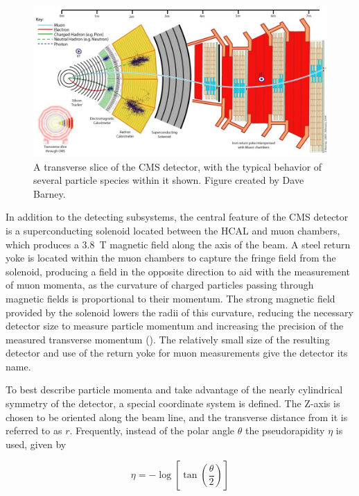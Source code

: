 \begin{figure}[htpb]
    \includegraphics[width=\textwidth]{figures/cmsSlice.jpg}
    \centering
	\caption[A Transverse Slice of the CMS Detector]{A transverse slice of the CMS detector, with the typical behavior of several particle species within it shown. Figure created by Dave Barney.}
    \label{fig:cmsSlice}
\end{figure}

In addition to the detecting subsystems, the central feature of the CMS detector is a superconducting solenoid located between the HCAL and muon chambers, which produces a \SI{3.8}{\tesla} magnetic field along the axis of the beam. 
A steel return yoke is located within the muon chambers to capture the fringe field from the solenoid, producing a field in the opposite direction to aid with the measurement of muon momenta, as the curvature of charged particles passing through magnetic fields is proportional to their momentum. The strong magnetic field provided by the solenoid lowers the radii of this curvature, reducing the necessary detector size to measure particle momentum and increasing the precision of the measured transverse momentum (\pt). 
The relatively small size of the resulting detector and use of the return yoke for muon measurements give the detector its name.

To best describe particle momenta and take advantage of the nearly cylindrical symmetry of the detector, a special coordinate system is defined. 
The Z-axis is chosen to be oriented along the beam line, and the transverse distance from it is referred to as $r$. 
Frequently, instead of the polar angle $\theta$ the pseudorapidity $\eta$ is used, given by

\begin{equation}
    \label{eq:pseudo}
    \eta = - \log \left[\tan\left(\frac{\theta}{2}\right)\right]
\end{equation}

